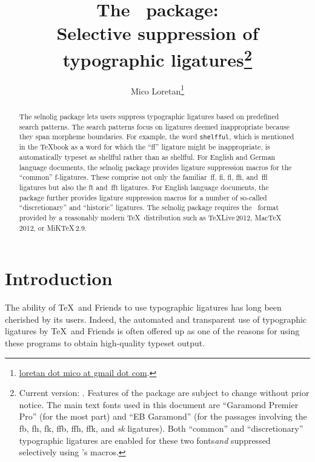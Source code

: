 \documentclass[12pt]{article}
\title{The \selnoligpackagename\ package: \\
Selective suppression of typographic ligatures\thanks{
Current version: \selnoligpackageversion. Features of the \pkg{selnolig} package are subject to change without prior notice. 
\newline\hspace*{\parindent}
The main text fonts used in this document are \enquote{Garamond Premier Pro} (for the most part) and \enquote{EB Garamond} (for the passages involving the \bgroup\ebg \mbox{fb}, \mbox{fh}, \mbox{fk}, \mbox{ffb}, \mbox{ffh},  \mbox{ffk}, and \emph{\mbox{sk}} ligatures\egroup). Both \enquote{common} and \enquote{discretionary} typographic ligatures are enabled for these two fonts\textemdash \emph{and} suppressed selectively using \pkg{selnolig}'s macros.}}
\author{Mico Loretan\thanks{
\href{mailto:loretan.mico@gmail.com}{loretan dot mico at gmail dot com}.}}
\date{\selnoligpackagedate}
\newcommand{\pkg}[1]{\textsf{#1}}
\newcommand{\opt}[1]{\texttt{#1}}
\begin{document}

\VerbatimFootnotes
{}

\maketitle


\begin{abstract}

The \pkg{selnolig} package lets users suppress typographic ligatures based on pre\-defined search patterns. The search patterns focus on ligatures deemed inappropriate because they span morpheme boundaries. For example, the word \opt{shelfful}, which is mentioned in the \TeX book as a word for which the \enquote{ff} ligature might be inappropriate, is automatically typeset as shelfful rather than as shel\mbox{ff}ul.
\newline\hspace*{\parindent}
For English and German language documents, the \pkg{selnolig} package provides ligature suppression macros for the \enquote{common} f-ligatures. These comprise not only the familiar~ff, fi, fl, ffi, and~ffl ligatures but also the ft and~fft ligatures.
\newline\hspace*{\parindent}
For English language documents, the package further provides ligature suppression macros for a number of so-called \enquote{discretionary} and \enquote{historic} ligatures.
\newline\hspace*{\parindent}
The \pkg{selnolig} package requires the \LuaLaTeX\ format provided by a reasonably modern \TeX\ distribution such as \TeX Live\,2012, Mac\TeX\,2012, or MiK\TeX\,2.9.
\end{abstract}


\tableofcontents

\clearpage
{}
\section{Introduction}

The ability of \TeX\ and Friends to use typographic ligatures has long been cherished by its users. Indeed, the automated and transparent use of typographic ligatures by \TeX\ and Friends is often offered up as one of the reasons for using these programs to obtain high-quality typeset output.
\end{document}
